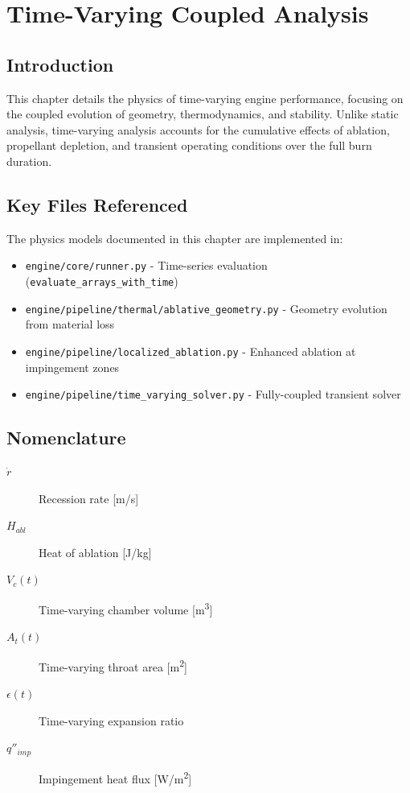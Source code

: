 \section{Time-Varying Coupled Analysis}

\subsection{Introduction}
This chapter details the physics of time-varying engine performance, focusing on the coupled evolution of geometry, thermodynamics, and stability. Unlike static analysis, time-varying analysis accounts for the cumulative effects of ablation, propellant depletion, and transient operating conditions over the full burn duration.

\subsection{Key Files Referenced}
The physics models documented in this chapter are implemented in:
\begin{itemize}
    \item \texttt{engine/core/runner.py} - Time-series evaluation (\texttt{evaluate\_arrays\_with\_time})
    \item \texttt{engine/pipeline/thermal/ablative\_geometry.py} - Geometry evolution from material loss
    \item \texttt{engine/pipeline/localized\_ablation.py} - Enhanced ablation at impingement zones
    \item \texttt{engine/pipeline/time\_varying\_solver.py} - Fully-coupled transient solver
\end{itemize}

\subsection{Nomenclature}
\begin{description}
    \item[$\dot{r}$] Recession rate [\si{m/s}]
    \item[$H_{abl}$] Heat of ablation [\si{J/kg}]
    \item[$V_c(t)$] Time-varying chamber volume [\si{m^3}]
    \item[$A_t(t)$] Time-varying throat area [\si{m^2}]
    \item[$\epsilon(t)$] Time-varying expansion ratio
    \item[$q''_{imp}$] Impingement heat flux [\si{W/m^2}]
\end{description}

